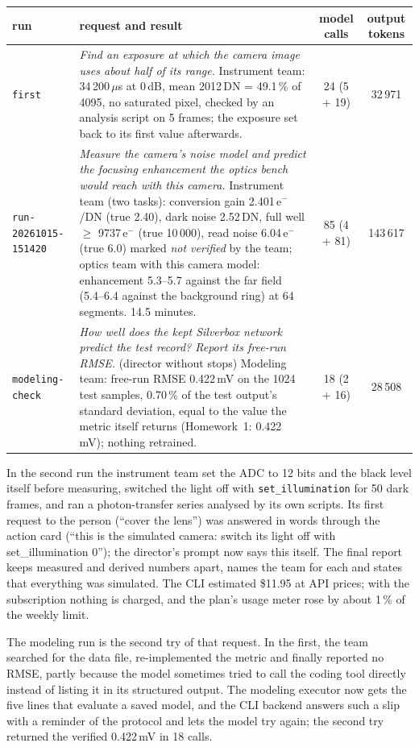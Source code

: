\documentclass[11pt,a4paper]{article}
\begin{document}
\begin{center}\small
\begin{tabularx}{\linewidth}{@{}lXcc@{}}
\toprule
run & request and result & model calls & output tokens\\ \midrule
\texttt{first} & \emph{Find an exposure at which the camera image uses about half of its range.} Instrument team:
  34\,200\,$\mu$s at 0\,dB, mean 2012\,DN = 49.1\,\% of 4095, no saturated pixel, checked by an analysis script on 5
  frames; the exposure set back to its first value afterwards. & 24 (5 + 19) & 32\,971\\
\texttt{run-20261015-151420} & \emph{Measure the camera's noise model and predict the focusing enhancement the optics
  bench would reach with this camera.} Instrument team (two tasks): conversion gain 2.401\,e$^-$/DN (true 2.40), dark
  noise 2.52\,DN, full well $\ge$ 9737\,e$^-$ (true 10\,000), read noise 6.04\,e$^-$ (true 6.0) marked \emph{not verified}
  by the team; optics team with this camera model: enhancement 5.3--5.7 against the far field (5.4--6.4 against the
  background ring) at 64 segments. 14.5 minutes. & 85 (4 + 81) &
  143\,617\\
\texttt{modeling-check} & \emph{How well does the kept Silverbox network predict the test record? Report its free-run
  RMSE.} (director without stops) Modeling team: free-run RMSE 0.422\,mV on the 1024 test samples, 0.70\,\% of the
  test output's standard deviation, equal to the value the metric itself returns (Homework~1: 0.422\,mV); nothing
  retrained. & 18 (2 + 16) & 28\,508\\
\bottomrule
\end{tabularx}
\end{center}

In the second run the instrument team set the ADC to 12 bits and the black level itself before measuring, switched the
light off with \texttt{set\_illumination} for 50 dark frames, and ran a photon-transfer series analysed by its own
scripts. Its first request to the person (``cover the lens'') was answered in words through the action card (``this is
the simulated camera: switch its light off with set\_illumination 0''); the director's prompt now says this itself. The
final report keeps measured and derived numbers apart, names the team for each and states that everything was
simulated. The CLI estimated \$11.95 at API prices; with the subscription nothing is charged, and the plan's usage meter
rose by about 1\,\% of the weekly limit.

The modeling run is the second try of that request. In the first, the team searched for the data file, re-implemented
the metric and finally reported no RMSE, partly because the model sometimes tried to call the coding tool directly
instead of listing it in its structured output. The modeling executor now gets the five lines that evaluate a saved
model, and the CLI backend answers such a slip with a reminder of the protocol and lets the model try again; the
second try returned the verified 0.422\,mV in 18 calls.
\end{document}
